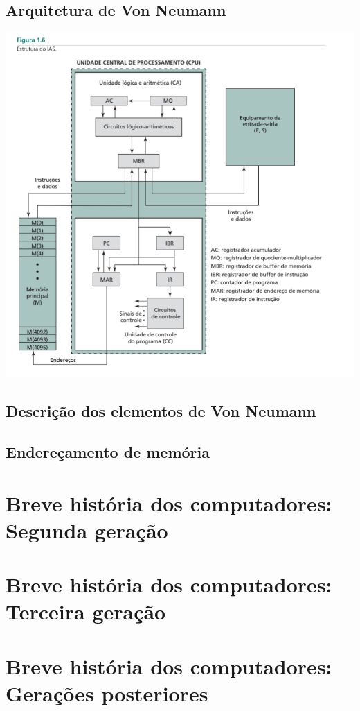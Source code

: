 \documentclass{article}
\begin{document}
\subsection{Arquitetura de Von Neumann}
\begin{center}
    \includegraphics[scale=1]{estruturaDoIAS.jpg}
    \qquad
\end{center}


\subsection{Descrição dos elementos de Von Neumann}
\subsection{Endereçamento de memória}

\section{Breve história dos computadores: Segunda geração}
\section{Breve história dos computadores: Terceira geração}
\section{Breve história dos computadores: Gerações posteriores}
\end{document}

